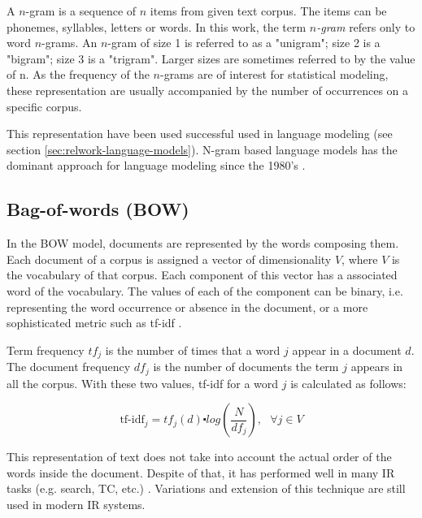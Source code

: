 A $n$-gram is a sequence of $n$ items from given text corpus. The items can
be phonemes, syllables, letters or words. In this  work, the term
\textit{$n$-gram} refers only   to  word $n$-grams.
An $n$-gram of size 1 is referred to as a "unigram"; size 2 is a "bigram";
size 3 is a "trigram". Larger sizes are sometimes referred to by the value of
n. As the frequency of the $n$-grams are of interest for statistical
modeling, these representation are usually accompanied by the number of
occurrences on a specific corpus. 


This representation  have been used successful used in language modeling (see section
\ref{sec:relwork-language-models}). N-gram based language models has the dominant approach for
 language modeling since the 1980's \cite{Bengio:2008}.



 \subsection{Bag-of-words (BOW)}
 \label{sec:rel_bow}

In the \ac{BOW} model, documents are represented by the words composing them.
Each document of a corpus is assigned a vector of dimensionality $V$, where $V$ is the
vocabulary of that corpus. Each component of this vector has a associated word of
the vocabulary. The values of each of the component can be binary, i.e. representing the
word occurrence or absence in the document, or a more sophisticated metric
such as \ac{tf-idf} \cite{Salton88term-weightingapproaches}.

Term frequency $tf_j$  is the number of times that a word $j$ appear in a
document $d$. The document frequency  $df_{j}$  is the number of documents
the term $j$ appears in all the corpus.  With these two values,  \ac{tf-idf}  for a  word $j$ is  calculated as follows:

\begin{equation*}
  \label{eq:tf-idf}
  \text{tf-idf}_{j}=tf_{j}(d)\centerdot log(\frac{N}{df_{j}}),\,\,\,\,\forall
  j \in V
\end{equation*}

This representation of text does not take  into account the actual order of the words inside the document. Despite
of that, it has  performed well in many \ac{IR} tasks (e.g. search, \ac{TC},
etc.) \cite{Sebastiani02}. Variations and extension of this technique are
still used in modern \ac{IR} systems.

